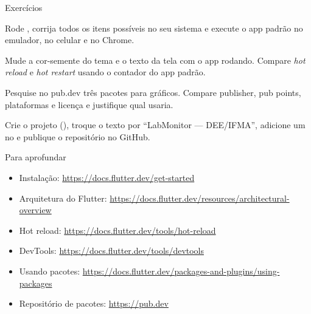 \documentclass[aspectratio=169,10pt]{beamer}
\begin{document}
\begin{frame}{Exercícios}
  \begin{exercicio}
    Rode , corrija todos os itens possíveis no seu sistema e execute o app padrão no emulador, no celular e no Chrome.
  \end{exercicio}
  \begin{exercicio}
    Mude a cor-semente do tema e o texto da tela com o app rodando. Compare \emph{hot reload} e \emph{hot restart} usando o contador do app padrão.
  \end{exercicio}
  \begin{exercicio}
    Pesquise no pub.dev três pacotes para gráficos. Compare publisher, pub points, plataformas e licença e justifique qual usaria.
  \end{exercicio}
  \begin{projeto}
    Crie o projeto  (), troque o texto por ``LabMonitor --- DEE/IFMA'', adicione um  no  e publique o repositório no GitHub.
  \end{projeto}
\end{frame}

\begin{frame}{Para aprofundar}
  \small
  \begin{itemize}
    \item Instalação: \url{https://docs.flutter.dev/get-started}
    \item Arquitetura do Flutter: \url{https://docs.flutter.dev/resources/architectural-overview}
    \item Hot reload: \url{https://docs.flutter.dev/tools/hot-reload}
    \item DevTools: \url{https://docs.flutter.dev/tools/devtools}
    \item Usando pacotes: \url{https://docs.flutter.dev/packages-and-plugins/using-packages}
    \item Repositório de pacotes: \url{https://pub.dev}
  \end{itemize}
\end{frame}
\end{document}
